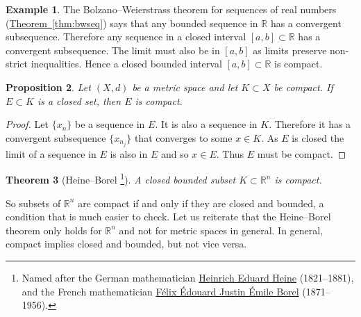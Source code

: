 \documentclass[12pt]{book}
\newcommand{\R}{{\mathbb{R}}}
\theoremstyle{plain}
\newtheorem{thm}{Theorem}[section]
\newtheorem{prop}[thm]{Proposition}
\theoremstyle{remark}
\theoremstyle{definition}
\theoremstyle{exercise}
\theoremstyle{example}
\newtheorem{example}[thm]{Example}
\newcommand{\thmref}[1]{\hyperref[#1]{Theorem~\ref*{#1}}}
\begin{document}
\begin{example}
The Bolzano--Weierstrass theorem for sequences of real numbers
(\thmref{thm:bwseq})
says that any bounded sequence in $\R$ has a convergent
subsequence.  Therefore any sequence in a closed interval $[a,b] \subset \R$ has 
a convergent subsequence.  The limit must also be in $[a,b]$ as limits
preserve non-strict inequalities.  Hence a closed bounded interval $[a,b]
\subset \R$ is compact.
\end{example}

\begin{prop}
Let $(X,d)$ be a metric space and let $K \subset X$ be compact.  If
$E \subset K$ is a closed set, then $E$ is compact.
\end{prop}

\begin{proof}
Let $\{ x_n \}$ be a sequence in $E$.  It is also a sequence in $K$.
Therefore it has a convergent subsequence $\{ x_{n_j} \}$ that converges to
some $x \in K$.  As $E$ is closed the limit of a sequence in $E$ is also in $E$
and so $x \in E$.  Thus $E$ must be compact.
\end{proof}

\begin{thm}[Heine--Borel%
\footnote{Named after the German mathematician 
\href{http://en.wikipedia.org/wiki/Eduard_Heine}{Heinrich Eduard Heine}
(1821--1881),
and the French mathematician
\href{http://en.wikipedia.org/wiki/\%C3\%89mile_Borel}{F\'elix \'Edouard Justin \'Emile Borel}
(1871--1956).}]%
\label{thm:msbw}
A closed bounded subset $K \subset \R^n$ is compact.
\end{thm}

So subsets of $\R^n$ are compact if and only if they are closed and bounded,
a condition that is much easier to check.
Let us reiterate that the Heine--Borel theorem only holds for $\R^n$ and not
for metric spaces in general.  In general, compact implies closed and
bounded, but not vice versa.
\end{document}

